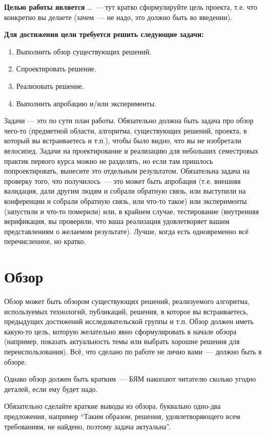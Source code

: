 \documentclass[a4paper]{article}
\begin{document}
\textbf{Целью работы является} \dots~--- тут кратко сформулируйте цель проекта, т.е. что конкретно вы делаете (зачем~--- не надо, это должно быть во введении).

\textbf{Для достижения цели требуется решить следующие задачи:}
\begin{enumerate}
    \item Выполнить обзор существующих решений.
    \item Спроектировать решение.
    \item Реализовать решение.
    \item Выполнить апробацию и/или эксперименты.
\end{enumerate}

Задачи --- это по сути план работы. Обязательно должна быть задача про обзор чего-то (предметной области, алгоритма, существующих решений, проекта, в который вы встраиваетесь и т.п.), чтобы было видно, что вы не изобретали велосипед. Задачи на проектирование и реализацию для небольших семестровых практик первого курса можно не разделять, но если там пришлось попроектировать, вынесите это отдельным результатом. Обязательна задача на проверку того, что получилось~--- это может быть апробация (т.е. внешняя валидация, дали другим людям и собрали обратную связь, или выступили на конференции и собрали обратную связь, или что-то такое) или эксперименты (запустили и что-то померили) или, в крайнем случае, тестирование (внутренняя верификация, вы проверили, что ваша реализация удовлетворяет вашим представлениям о желаемом результате). Лучше, когда есть одновременно всё перечисленное, но кратко.

\section{Обзор}

Обзор может быть обзором существующих решений, реализуемого алгоритма, используемых технологий, публикаций, решения, в которое вы встраиваетесь, предыдущих достижений исследовательской группы и т.п. Обзор должен иметь какую-то цель, которую желательно явно сформулировать в начале обзора (например, показать актуальность темы или выбрать хорошие решения для переиспользования). Всё, что сделано по работе не лично вами~--- должно быть в обзоре.

Однако обзор должен быть кратким~--- БЯМ накопают читателю сколько угодно деталей, если ему будет надо.

Обязательно сделайте краткие выводы из обзора, буквально одно-два предложения, например \enquote{Таким образом, решения, удовлетворяющего всем требованиям, не найдено, поэтому задача актуальна}.
\end{document}
